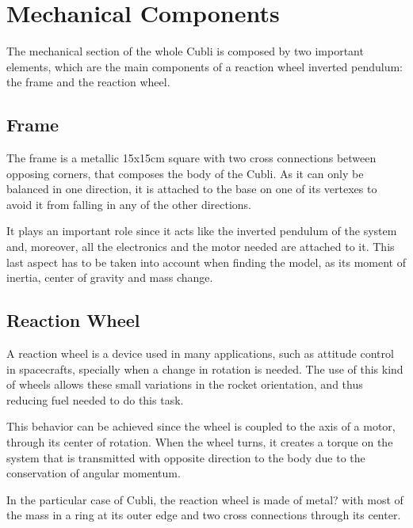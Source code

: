 \section{Mechanical Components}
The mechanical section of the whole Cubli is composed by two important elements, which are the main components of a reaction wheel inverted pendulum: the frame and the reaction wheel.

\subsection{Frame}
The frame is a metallic  15x15cm square with two cross connections between opposing corners, that composes the body of the Cubli. As it can only be balanced in one direction, it is attached to the base on one of its vertexes to avoid it from falling in any of the other directions.

It plays an important role since it acts like the inverted pendulum of the system and, moreover, all the electronics and the motor needed are attached to it. This last aspect has to be taken into account when finding the model, as its moment of inertia, center of gravity and mass change.

\subsection{Reaction Wheel}
A reaction wheel is a device used in many applications, such as attitude control in spacecrafts, specially when a change in rotation is needed. The use of this kind of wheels allows these small variations in the rocket orientation, and thus reducing fuel needed to do this task.

 This behavior can be achieved since the wheel is coupled to the axis of a motor, through its center of rotation. When the wheel turns, it creates a torque on the system that is transmitted with opposite direction to the body due to the conservation of angular momentum.

In the particular case of Cubli, the reaction wheel is made of metal?  with most of the mass in a ring at its outer edge and two cross connections through its center.
